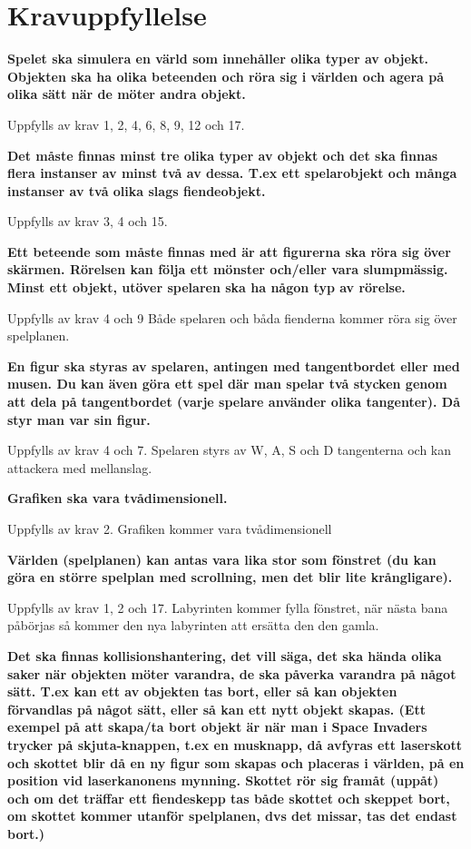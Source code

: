 \documentclass{TDP005mall}
\begin{document}
\newpage
\section{Kravuppfyllelse}


\textbf{Spelet ska simulera en värld som innehåller olika typer av objekt. Objekten ska ha olika beteenden och röra sig i världen och agera på olika sätt när de möter andra objekt.}

Uppfylls av krav 1, 2, 4, 6, 8, 9, 12 och 17.

\textbf{Det måste finnas minst tre olika typer av objekt och det ska finnas flera instanser av minst två av dessa. T.ex ett spelarobjekt och många instanser av två olika slags fiendeobjekt.}

Uppfylls av krav 3, 4 och 15.

\textbf{Ett beteende som måste finnas med är att figurerna ska röra sig över skärmen. Rörelsen kan följa ett mönster och/eller vara slumpmässig. Minst ett objekt, utöver spelaren ska ha någon typ av rörelse.}

Uppfylls av krav 4 och 9
Både spelaren och båda fienderna kommer röra sig över spelplanen.

\textbf{En figur ska styras av spelaren, antingen med tangentbordet eller med musen. Du kan även göra ett spel där man spelar två stycken genom att dela på tangentbordet (varje spelare använder olika tangenter). Då styr man var sin figur.}

Uppfylls av krav 4 och 7. 
Spelaren styrs av W, A, S och D tangenterna och kan attackera med mellanslag.

\textbf{Grafiken ska vara tvådimensionell.}

Uppfylls av krav 2.
Grafiken kommer vara tvådimensionell 

\textbf{Världen (spelplanen) kan antas vara lika stor som fönstret (du kan göra en större spelplan med scrollning, men det blir lite krångligare).}

Uppfylls av krav 1, 2 och 17.
Labyrinten kommer fylla fönstret, när nästa bana påbörjas så kommer den nya labyrinten att ersätta den den gamla.

\textbf{Det ska finnas kollisionshantering, det vill säga, det ska hända olika saker när objekten möter varandra, de ska påverka varandra på något sätt. T.ex kan ett av objekten tas bort, eller så kan objekten förvandlas på något sätt, eller så kan ett nytt objekt skapas. (Ett exempel på att skapa/ta bort objekt är när man i Space Invaders trycker på skjuta-knappen, t.ex en musknapp, då avfyras ett laserskott och skottet blir då en ny figur som skapas och placeras i världen, på en position vid laserkanonens mynning. Skottet rör sig framåt (uppåt) och om det träffar ett fiendeskepp tas både skottet och skeppet bort, om skottet kommer utanför spelplanen, dvs det missar, tas det endast bort.)}
\end{document}
